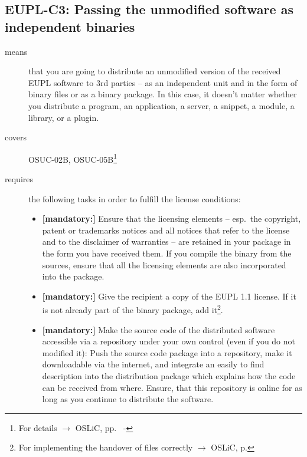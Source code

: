 \subsection{EUPL-C3: Passing the unmodified software as independent binaries} 
\label{OSUC-02B-EUPL} \label{OSUC-05B-EUPL}

\begin{description}

\item[means] that you are going to distribute an unmodified version of the
received EUPL software to 3rd parties -- as an independent unit and in the form
of binary files or as a binary package. In this case, it doesn't matter whether
you distribute a program, an application, a server, a snippet, a module, a
library, or a plugin.

\item[covers] OSUC-02B, OSUC-05B\footnote{For details $\rightarrow$
OSLiC, pp.\ \pageref{OSUC-02B-DEF} - \pageref{OSUC-05B-DEF}}

\item[requires] the following tasks in order to fulfill the license conditions:
\begin{itemize}
  
  \item \textbf{[mandatory:]} Ensure that the licensing elements -- esp.\ the
  copyright, patent or trademarks notices and all notices that refer to the
  license and to the disclaimer of warranties -- are retained in your package in
  the form you have received them. If you compile the binary from the sources,
  ensure that all the licensing elements are also incorporated into the package.
  
  \item \textbf{[mandatory:]} Give the recipient a copy of the EUPL 1.1
  license. If it is not already part of the binary package, add
  it\footnote{For implementing the handover of files correctly $\rightarrow$
  OSLiC, p. \pageref{DistributingFilesHint}}.

  \item \textbf{[mandatory:]} Make the source code of the distributed software
  accessible via a repository under your own control (even if you do not
  modified it): Push the source code package into a repository, make it
  downloadable via the internet, and integrate an easily to find description
  into the distribution package which explains how the code can be received from
  where. Ensure, that this repository is online for as long as you continue to
  distribute the software.
  

\end{itemize}
\end{description}
